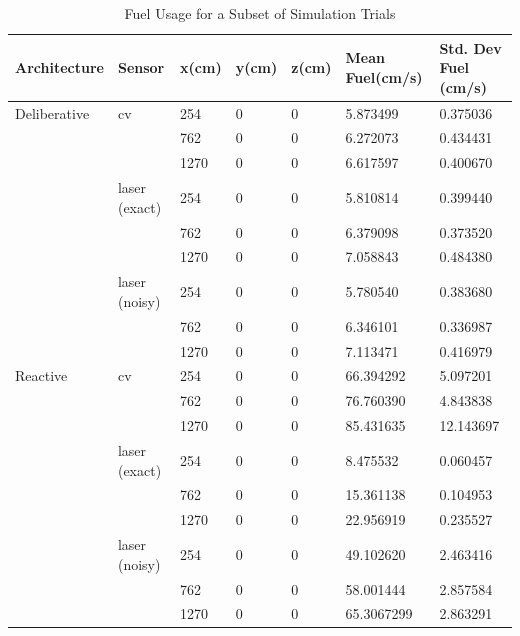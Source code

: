 \documentclass[journal, 10pt]{IEEEtran}
\begin{document}
\begin{table}
\centering
\normalsize
\caption{Fuel Usage for a Subset of Simulation Trials}
\begin{tabular}{lllllll}
\toprule
Architecture & Sensor & x(cm) & y(cm) & z(cm) & Mean Fuel(cm/s) & Std. Dev Fuel (cm/s)\\
\midrule
Deliberative & cv & 254 &  0 & 0 & 5.873499 & 0.375036\\
& & 762 &  0 & 0 &  6.272073 & 0.434431\\
& & 1270 & 0 & 0 &  6.617597 &0.400670\\
			& laser (exact) & 254 & 0 & 0 &    5.810814 &0.399440\\
			& & 762 & 0 & 0 &    6.379098 &0.373520\\
			& & 1270 & 0 & 0 & 7.058843 & 0.484380\\
			& laser (noisy) & 254 & 0 & 0 &    5.780540 &0.383680\\
			& & 762 & 0 & 0 &    6.346101 &0.336987\\
			& & 1270 & 0 & 0 & 7.113471 &0.416979\\
\cmidrule(lr) {1-7}
Reactive & cv & 254 & 0 & 0 &   66.394292 &5.097201\\
& & 762 & 0 & 0 &   76.760390 & 4.843838\\
& & 1270 & 0 & 0 & 85.431635 &12.143697\\
& laser (exact) & 254 & 0 & 0 &   8.475532 & 0.060457\\
& & 762 & 0 & 0  &  15.361138 &0.104953\\
& & 1270 & 0 & 0 & 22.956919 & 0.235527\\
& laser (noisy) & 254 & 0 & 0 &  49.102620 & 2.463416\\
& & 762 & 0 & 0  &  58.001444 &2.857584\\
& & 1270 & 0 & 0 & 65.3067299 &2.863291\\
\bottomrule
\end{tabular}
\label{initial}
\end{table}
\end{document}
